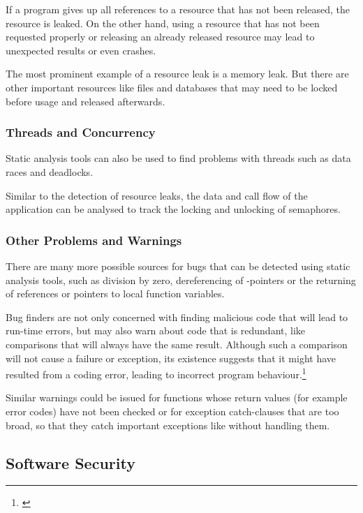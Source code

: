 If a program gives up all references to a resource that has not been released, the resource is leaked. On the other hand, using a resource that has not been requested properly or releasing an already released resource may lead to unexpected results or even crashes.

The most prominent example of a resource leak is a memory leak. But there are other important resources like files and databases that may need to be locked before usage and released afterwards.

\subsubsection{Threads and Concurrency}

Static analysis tools can also be used to find problems with threads such as data races and deadlocks.

Similar to the detection of resource leaks, the data and call flow of the application can be analysed to track the locking and unlocking of semaphores.

\subsubsection{Other Problems and Warnings}

There are many more possible sources for bugs that can be detected using static analysis tools, such as division by zero, dereferencing of -pointers or the returning of references or pointers to local function variables.

Bug finders are not only concerned with finding malicious code that will lead to run-time errors, but may also warn about code that is redundant, like comparisons that will always have the same result. Although such a comparison will not cause a failure or exception, its existence suggests that it might have resulted from a coding error, leading to incorrect program behaviour.\footnote{\citep[1]{UsingSAToFindBugs}}

Similar warnings could be issued for functions whose return values (for example error codes) have not been checked or for exception catch-clauses that are too broad, so that they catch important exceptions like  without handling them.

\subsection{Software Security}

